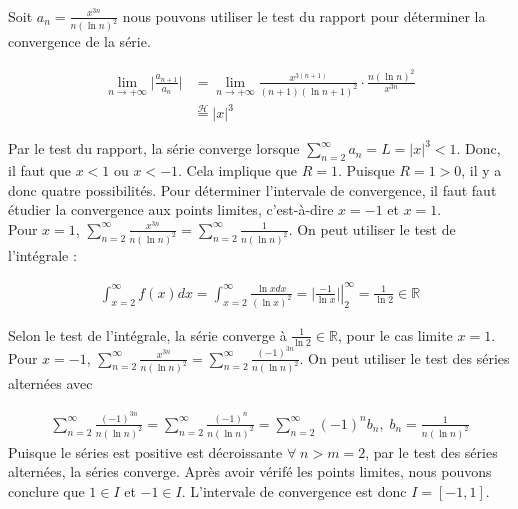 \documentclass{report}
\newcommand*\Eval[3]{\left.#1\right\rvert_{#2}^{#3}}
\begin{document}
\begin{multicols*}{2}
  \mbox{}\\
  Soit $a_n = \frac{x^{3n}}{n(\ln n)^2}$ nous pouvons utiliser le 
  test du rapport pour déterminer la convergence de la série. 


  \begin{align*}
    \lim\limits_{n \to+\infty }  \Big|\frac{a_{n+1}}{a_n}\Big| &=  
    \lim\limits_{n \to+\infty } \frac{x^{3(n+1)}}{(n+1)(\ln n + 1 )^2}  
    \cdot                \frac{n(\ln n)^2}{x^{3n}} \\ 
                                          &\overset{\mathcal{H}}{=}
      |x|^3 
   \end{align*}

   Par le test du  rapport, la série converge lorsque 
   $\sum_{n=2}^{\infty }a_n = L = |x|^3 < 1$. Donc, il faut que 
   $x < 1$ ou $x < -1$. Cela implique que $R = 1$. 
   Puisque $R = 1 > 0$, il y a donc quatre possibilités. 
   Pour déterminer l'intervale de convergence, il faut faut étudier 
   la convergence aux points limites, c'est-à-dire $x = -1$ et 
   $x = 1$. 
   \vspace{1em}\\
   Pour $x = 1$, $\sum_{n=2}^{\infty }\frac{x^{3n}}{n(\ln n)^2} = 
     \sum_{n=2}^{\infty }\frac{1}{n(\ln n)^2}$. On peut utiliser le 
     test de l'intégrale : 

     \begin{align*}
        \int_{x=2}^{\infty }f(x)dx = \int_{x=2}^{\infty } 
        \frac{\ln x dx}{(\ln x)^2} = 
        \Eval{\Big| \frac{-1}{\ln x}  \Big|}{2}{\infty}
        = \frac{1}{\ln 2} \in \mathbb{R} 
     \end{align*}

     Selon le test de l'intégrale, la série converge à $\frac{1}{\ln 2}
     \in \mathbb{R}$, pour le cas limite $x = 1$.  
     \vspace{1em} \\ 
      Pour $x = -1$, $\sum_{n=2}^{\infty }\frac{x^{3n}}{n(\ln n)^2} = 
      \sum_{n=2}^{\infty }\frac{(-1)^{3n}}{n(\ln n)^2}$. On peut utiliser 
      le test des séries alternées avec

      \begin{align*}
       \sum_{n=2}^{\infty }\frac{(-1)^{3n}}{n(\ln n)^2} = 
       \sum_{n=2}^{\infty }\frac{(-1)^{n}}{n(\ln n)^2} = 
       \sum_{n=2}^{\infty }(-1)^n b_n, \; b_n = \frac{1}{n(\ln n)^2}
      \end{align*}
      Puisque le séries est positive est décroissante 
      $\forall \; n > m = 2$, par le test des séries alternées, 
      la séries converge. Après avoir vérifé les points limites, 
      nous pouvons conclure que $1 \in I$ et $-1 \in I$. 
      L'intervale de convergence est donc 
      $I = [-1, 1]$. 



\end{multicols*}
\end{document}
